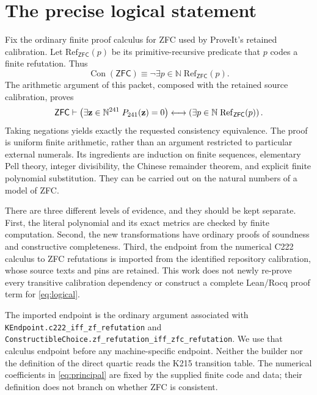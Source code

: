 \documentclass[11pt,letterpaper]{article}
\newcommand{\N}{\mathbb N}
\newcommand{\Con}{\operatorname{Con}}
\newcommand{\ZFC}{\mathsf{ZFC}}
\newcommand{\pathfile}[1]{\nolinkurl{#1}}
\theoremstyle{remark}\newtheorem{remark}[theorem]{Remark}
\begin{document}
\section{The precise logical statement}

Fix the ordinary finite proof calculus for ZFC used by ProveIt's retained
calibration.  Let $\mathrm{Ref}_{\ZFC}(p)$ be its primitive-recursive
predicate that $p$ codes a finite refutation.  Thus
\[
 \Con(\ZFC)\equiv\neg\exists p\in\N\;\mathrm{Ref}_{\ZFC}(p).
\]
The arithmetic argument of this packet, composed with the retained source
calibration, proves
\begin{equation}\label{eq:logical}
 \ZFC\vdash
 \left(\exists\mathbf z\in\N^{\MainVars}\;P_{\MainVars}(\mathbf z)=0\right)
 \longleftrightarrow
 \left(\exists p\in\N\;\mathrm{Ref}_{\ZFC}(p)\right).
\end{equation}
Taking negations yields exactly the requested consistency equivalence.
The proof is uniform finite arithmetic, rather than an argument restricted
to particular external numerals.  Its ingredients are induction on finite
sequences, elementary Pell theory, integer divisibility, the Chinese
remainder theorem, and explicit finite polynomial substitution.  They
can be carried out on the natural numbers of a model of ZFC.

There are three different levels of evidence, and they should be kept
separate.  First, the literal polynomial and its exact metrics are checked
by finite computation.  Second, the new transformations have ordinary
proofs of soundness and constructive completeness.  Third, the endpoint
from the numerical C222 calculus to ZFC refutations is imported from the
identified repository calibration, whose source texts and pins are retained.
This work does not newly re-prove every transitive calibration dependency
or construct a complete Lean/Rocq proof term for \eqref{eq:logical}.

The imported endpoint is the ordinary argument associated with
\pathfile{KEndpoint.c222_iff_zf_refutation} and
\pathfile{ConstructibleChoice.zf_refutation_iff_zfc_refutation}.
We use that calculus endpoint before any machine-specific endpoint.
Neither the builder nor the definition of the direct quartic reads the
K215 transition table.  The numerical coefficients in
\eqref{eq:principal} are fixed by the supplied finite code and data; their
definition does not branch on whether ZFC is consistent.
\end{document}
